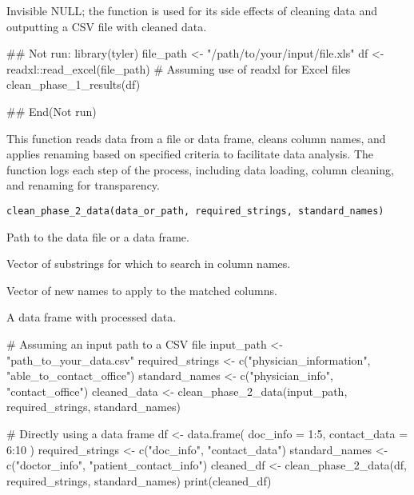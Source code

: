 \documentclass[a4paper]{book}
\begin{document}
%
\begin{Value}
Invisible NULL; the function is used for its side effects of cleaning data
and outputting a CSV file with cleaned data.
\end{Value}
%
\begin{Examples}
\begin{ExampleCode}
## Not run: 
library(tyler)
file_path <- "/path/to/your/input/file.xls"
df <- readxl::read_excel(file_path)  # Assuming use of readxl for Excel files
clean_phase_1_results(df)

## End(Not run)

\end{ExampleCode}
\end{Examples}
%
\begin{Description}
This function reads data from a file or data frame, cleans column names, and applies renaming based on specified criteria to facilitate data analysis. The function logs each step of the process, including data loading, column cleaning, and renaming for transparency.
\end{Description}
%
\begin{Usage}
\begin{verbatim}
clean_phase_2_data(data_or_path, required_strings, standard_names)
\end{verbatim}
\end{Usage}
%
\begin{Arguments}
\begin{ldescription}
\item[\code{data\_or\_path}] Path to the data file or a data frame.

\item[\code{required\_strings}] Vector of substrings for which to search in column names.

\item[\code{standard\_names}] Vector of new names to apply to the matched columns.
\end{ldescription}
\end{Arguments}
%
\begin{Value}
A data frame with processed data.
\end{Value}
%
\begin{Examples}
\begin{ExampleCode}
# Assuming an input path to a CSV file
input_path <- "path_to_your_data.csv"
required_strings <- c("physician_information", "able_to_contact_office")
standard_names <- c("physician_info", "contact_office")
cleaned_data <- clean_phase_2_data(input_path, required_strings, standard_names)

# Directly using a data frame
df <- data.frame(
  doc_info = 1:5,
  contact_data = 6:10
)
required_strings <- c("doc_info", "contact_data")
standard_names <- c("doctor_info", "patient_contact_info")
cleaned_df <- clean_phase_2_data(df, required_strings, standard_names)
print(cleaned_df)
\end{ExampleCode}
\end{Examples}
\end{document}
